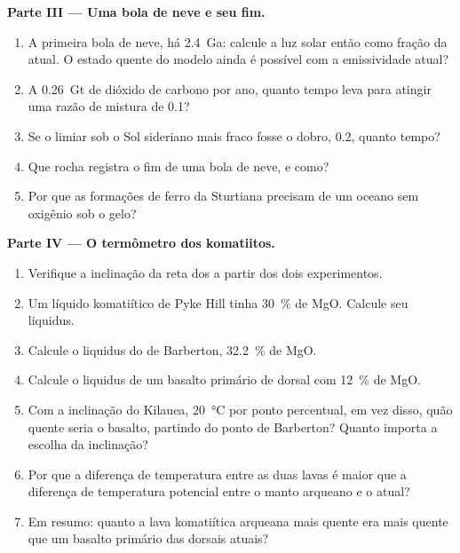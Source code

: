 \begin{problem}
\noindent\textbf{Parte III --- Uma bola de neve e seu fim.}
\begin{enumerate}[resume]
  \item A primeira bola de neve, há \qty{2.4}{Ga}: calcule a luz solar então como fração da atual.
        O estado quente do modelo ainda é possível com a emissividade atual?
  \item A \qty{0.26}{Gt} de dióxido de carbono por ano, quanto tempo leva para atingir uma razão
        de mistura de 0.1?
  \item Se o limiar sob o Sol sideriano mais fraco fosse o dobro, 0.2, quanto tempo?
  \item Que rocha registra o fim de uma bola de neve, e como?
  \item Por que as formações de ferro da Sturtiana precisam de um oceano sem oxigênio sob o gelo?
\end{enumerate}

\noindent\textbf{Parte IV --- O termômetro dos komatiitos.}
\begin{enumerate}[resume]
  \item Verifique a inclinação da reta dos  a partir dos dois experimentos.
  \item Um líquido komatiítico de Pyke Hill tinha \qty{30}{\percent} de MgO. Calcule seu liquidus.
  \item Calcule o liquidus do  de Barberton, \qty{32.2}{\percent} de MgO.
  \item Calcule o liquidus de um basalto primário de dorsal com \qty{12}{\percent} de MgO.
  \item Com a inclinação do Kilauea, \qty{20}{\celsius} por ponto percentual, em vez disso, quão quente seria o
        basalto, partindo do ponto de Barberton? Quanto importa a escolha da inclinação?
  \item Por que a diferença de temperatura entre as duas lavas é maior que a diferença de
        temperatura potencial entre o manto arqueano e o atual?
  \item Em resumo: quanto a lava komatiítica arqueana mais quente era mais quente que um basalto primário
        das dorsais atuais?
\end{enumerate}
\end{problem}
